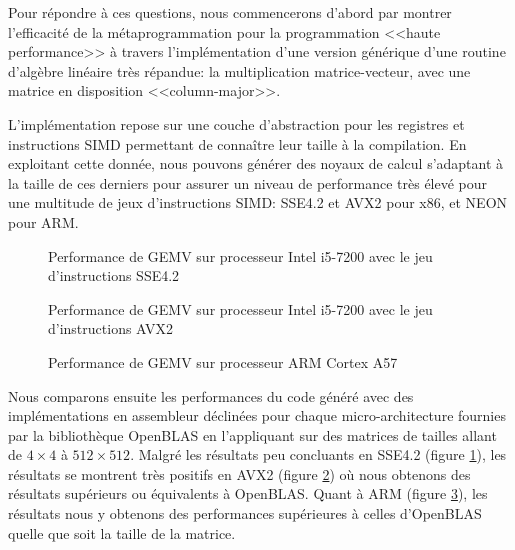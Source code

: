 \documentclass[main]{subfiles}
\begin{document}
Pour r\'epondre \`a ces questions, nous commencerons d'abord par montrer
l'efficacit\'e de la m\'etaprogrammation \cpp pour la programmation
<<haute performance>> \`a travers l'impl\'ementation d'une version
g\'en\'erique d'une routine d'alg\`ebre lin\'eaire tr\`es r\'epandue:
la multiplication matrice-vecteur, avec une matrice en disposition
<<column-major>>.

L'impl\'ementation repose sur une couche d'abstraction pour les registres et
instructions SIMD permettant de conna\^itre leur taille \`a la compilation.
En exploitant cette donn\'ee, nous pouvons g\'en\'erer des noyaux de calcul
s'adaptant \`a la taille de ces derniers pour assurer un niveau de performance
tr\`es \'elev\'e pour une multitude de jeux d'instructions SIMD: SSE4.2 et AVX2
pour x86, et NEON pour ARM.

\begin{figure}[h]
\fontsize{8}{10}\selectfont

\caption{
  Performance de GEMV sur processeur Intel i5-7200
  avec le jeu d'instructions SSE4.2
}
\label{fig:gemv-sse-bench-fr}
\end{figure}

\begin{figure}[h]
\fontsize{8}{10}\selectfont

\caption{
  Performance de GEMV sur processeur Intel i5-7200
  avec le jeu d'instructions AVX2
}
\label{fig:gemv-avx-bench-fr}
\end{figure}

\begin{figure}[h]
\fontsize{8}{10}\selectfont

\caption{
  Performance de GEMV sur processeur ARM Cortex A57
}
\label{fig:gemv-arm-bench-fr}
\end{figure}

Nous comparons ensuite les performances du code g\'en\'er\'e avec des
impl\'ementations en assembleur d\'eclin\'ees pour chaque micro-architecture
fournies par la biblioth\`eque OpenBLAS en l'appliquant sur des matrices de
tailles allant de $4 \times 4$ \`a $512 \times 512$.
Malgr\'e les r\'esultats peu concluants en SSE4.2
(figure \ref{fig:gemv-sse-bench-fr}), les r\'esultats se montrent
tr\`es positifs en AVX2 (figure \ref{fig:gemv-avx-bench-fr}) o\`u nous obtenons
des r\'esultats sup\'erieurs ou \'equivalents \`a OpenBLAS. Quant \`a ARM
(figure \ref{fig:gemv-arm-bench-fr}), les r\'esultats nous y obtenons
des performances sup\'erieures \`a celles d'OpenBLAS quelle que soit la taille
de la matrice.
\\
\end{document}
